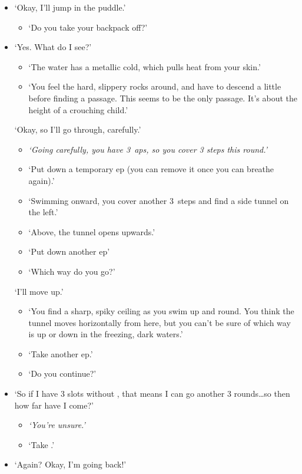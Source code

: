 \begin{multicols}{2}
{  \begin{itemize}
    \bf
    \item
    `Okay, I'll jump in the puddle.'
    \begin{itemize}
      \it
      \item
      `Do you take your backpack off?'
    \end{itemize}
    \item
    `Yes.
    What do I see?'
    \begin{itemize}
      \it
      \item
      `The water has a metallic cold, which pulls heat from your skin.'
      \item
      `You feel the hard, slippery rocks around, and have to descend a little before finding a passage.
      This seems to be the only passage.
      It's about the height of a crouching child.'
    \end{itemize}
    `Okay, so I'll go through, carefully.'
    \begin{itemize}
      \item
      \it
      `Going carefully, you have 3~\glspl{ap}, so you cover 3 steps this round.'
      \item
      `Put down a temporary \gls{ep} (you can remove it once you can breathe again).'
      \item
      `Swimming onward, you cover another 3~\glspl{step} and find a side tunnel on the left.'
      \item
      `Above, the tunnel opens upwards.'
      \item
      `Put down another \gls{ep}'
      \item
      `Which way do you go?'
    \end{itemize}
    `I'll move up.'
    \begin{itemize}
      \it
      \item
      `You find a sharp, spiky ceiling as you swim up and round.
      You think the tunnel moves horizontally from here, but you can't be sure of which way is up or down in the freezing, dark waters.'
      \item
      `Take another \gls{ep}.'
      \item
      `Do you continue?'
    \end{itemize}
    \item
    `So if I have 3 slots without , that means I can go another 3 rounds\ldots so then how far have I come?'
    \begin{itemize}
      \item
      \it
      `You're unsure.'
      \item
      `Take .'
    \end{itemize}
    \item
    `Again?
    Okay, I'm going back!'
  \end{itemize}

}
\end{multicols}
